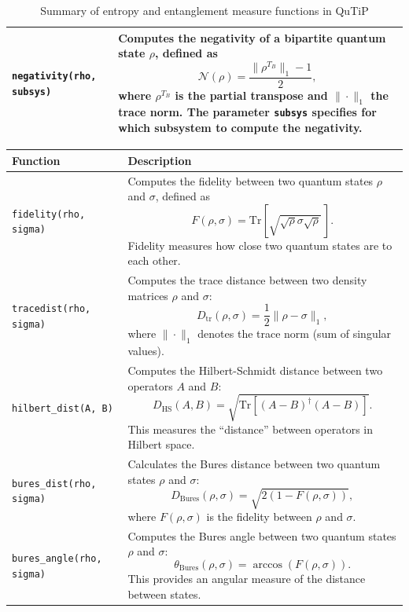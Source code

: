 \documentclass[preprint,3p,sort&compress]{elsarticle}
\def\code#1{\texttt{#1}}
\begin{document}
\begin{table}[!hp]
\begin{tabular}{@{}lp{11cm}@{}}
\code{negativity(rho, subsys)} & Computes the negativity of a bipartite quantum state $\rho$, defined as
\[
\mathcal{N}(\rho) = \frac{\|\rho^{T_B}\|_1 - 1}{2} ,
\]
where $\rho^{T_B}$ is the partial transpose and $\|\cdot\|_1$ the trace norm.
The parameter \code{subsys} specifies for which subsystem to compute the negativity. \\ 
\bottomrule
\end{tabular}
\caption{Summary of entropy and entanglement measure functions in QuTiP}
\label{table:entropy_functions}
\end{table}

\newpage

\begin{table}[!hp]
\centering
 \renewcommand{\arraystretch}{1.3}
\begin{tabular}{@{}lp{11.3cm}@{}}
\toprule
\textbf{Function} & \textbf{Description} \\ 
\midrule

\code{fidelity(rho, sigma)} & Computes the fidelity between two quantum states $\rho$ and $\sigma$, defined as
\[
F(\rho, \sigma) =  \text{Tr} \left[ \sqrt{ \sqrt{\rho} \sigma \sqrt{\rho} } \, \right] .
\]
Fidelity measures how close two quantum states are to each other. \\ 

\code{tracedist(rho, sigma)} & Computes the trace distance between two density matrices $\rho$ and $\sigma$:
\[
D_{\text{tr}}(\rho, \sigma) = \frac{1}{2} \| \rho - \sigma \|_1 ,
\]
where $\| \cdot \|_1$ denotes the trace norm (sum of singular values). \\ 

\code{hilbert\_dist(A, B)} & Computes the Hilbert-Schmidt distance between two operators $A$ and $B$:
\[
D_{\text{HS}}(A, B) = \sqrt{ \text{Tr} \left[ (A - B)^\dagger (A - B) \right] } .
\]
This measures the ``distance'' between operators in Hilbert space. \\ 

\code{bures\_dist(rho, sigma)} & Calculates the Bures distance between two quantum states $\rho$ and $\sigma$:
\[
D_{\text{Bures}}(\rho, \sigma) = \sqrt{2 \left(1 - {F(\rho, \sigma)} \right)} ,
\]
where $F(\rho, \sigma)$ is the fidelity between $\rho$ and $\sigma$. \\ 

\code{bures\_angle(rho, sigma)} & Computes the Bures angle between two quantum states $\rho$ and $\sigma$:
\[
\theta_{\text{Bures}}(\rho, \sigma) = \arccos \left({F(\rho, \sigma)} \right) .
\]
This provides an angular measure of the distance between states. \\ 


\end{tabular}
\end{table}
\end{document}
